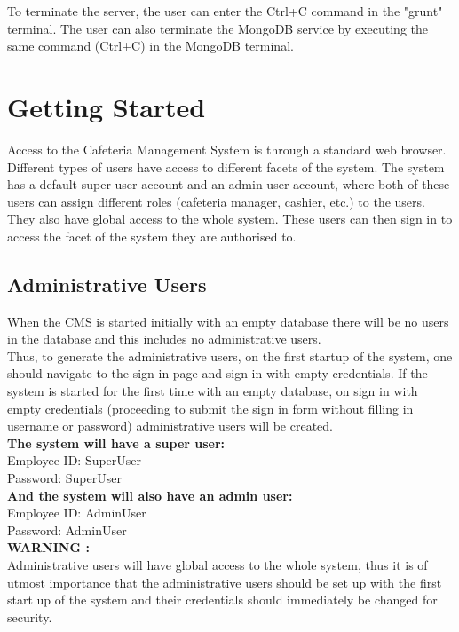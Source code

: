 \documentclass[a4paper,12pt]{article}
\begin{document}
To terminate the server, the user can enter the Ctrl+C command in the "grunt" terminal. The user can also terminate the MongoDB service by executing the same command (Ctrl+C) in the MongoDB terminal.

\section{Getting Started}
Access to the Cafeteria Management System is through a standard web browser. Different types of users have access to different facets of the system. The system has a default super user account and an admin user account, where both of these users can assign different roles (cafeteria manager, cashier, etc.) to the users. They also have global access to the whole system. These users can then sign in to access the facet of the system they are authorised to.\\

\subsection{Administrative Users}
When the CMS is started initially with an empty database there will be no users in the database and this includes no administrative users.  \\
Thus, to generate the administrative users, on the first startup of the system, one should navigate to the sign in page and sign in with empty credentials. If the system is started for the first time with an empty database, on sign in with empty credentials (proceeding to submit the sign in form without filling in username or password) administrative users will be created. \\

\textbf{The system will have a super user:} \\
Employee ID: SuperUser \\
Password: SuperUser \\

\textbf{And the system will also have an admin user:} \\
Employee ID: AdminUser \\
Password: AdminUser \\

\textbf{WARNING :} \\
Administrative users will have global access to the whole system, thus it is of utmost importance that the administrative users should be set up with the first start up of the system and their credentials should immediately be changed for security. \\ 
\end{document}
